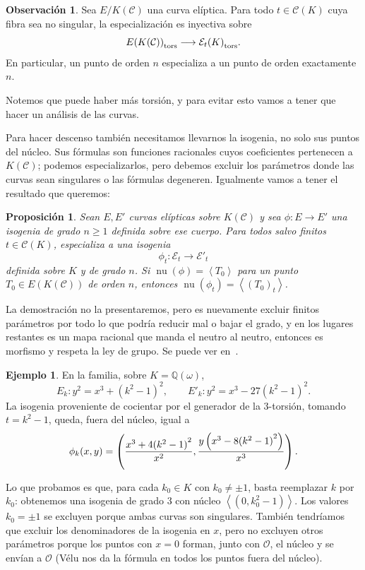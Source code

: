 \documentclass[a4paper]{book}
\theoremstyle{definition}
\newtheorem{example}[definition]{Ejemplo}
\newtheorem*{remark*}{Observación}
\theoremstyle{plain}
\newtheorem*{prop*}{Proposición}
\newcommand{\nbd}{\nobreakdash}
\DeclareMathOperator{\nuc}{nu}
\newcommand{\QQ}{\mathbb{Q}}
\newcommand{\OO}{\mathcal{O}}
\newcommand{\cc}{\mathcal{C}}
\newcommand{\ee}{\mathcal{E}}
\newcommand{\lp}{\left\lparen}
\newcommand{\rp}{\right\rparen}
\newcommand{\lc}{\left<}
\newcommand{\rc}{\right>}
\begin{document}
\begin{remark*}
Sea $E/K(\cc)$ una curva elíptica. Para todo $t\in\cc(K)$ cuya fibra sea no singular, la especialización es inyectiva sobre
\[
{E(K(\cc))}_{\rm tors}\longrightarrow{\ee_t(K)}_{\rm tors}.
\]
En particular, un punto de orden $n$ especializa a un punto de orden exactamente $n$.
\end{remark*}

Notemos que puede haber más torsión, y para evitar esto vamos a tener que hacer un análisis de las curvas.

Para hacer descenso también necesitamos llevarnos la isogenia, no solo sus puntos del núcleo. Sus fórmulas son funciones racionales cuyos coeficientes pertenecen a $K(\cc)$; podemos especializarlos, pero debemos excluir los parámetros donde las curvas sean singulares o las fórmulas degeneren. Igualmente vamos a tener el resultado que queremos:

\begin{prop*}
Sean $E,E'$ curvas elípticas sobre $K(\cc)$ y sea $\phi:E\to E'$ una isogenia de grado $n\geq1$ definida sobre ese cuerpo. Para todos salvo finitos $t\in\cc(K)$, especializa a una isogenia
\[
\phi_t:\ee_t\longrightarrow\ee'_t
\]
definida sobre $K$ y de grado $n$. Si $\nuc(\phi)=\lc T_0\rc$ para un punto $T_0\in E(K(\cc))$ de orden $n$, entonces $\nuc(\phi_t)=\lc {(T_0)}_t\rc$.
\end{prop*}

La demostración no la presentaremos, pero es nuevamente excluir finitos parámetros por todo lo que podría reducir mal o bajar el grado, y en los lugares restantes es un mapa racional que manda el neutro al neutro, entonces es morfismo y respeta la ley de grupo. Se puede ver en~\cite{SilvermanAdvanced}. 

\begin{example}
En la familia, sobre $K=\QQ(\omega)$,
\[
E_k:y^2=x^3+{(k^2-1)}^2,\qquad
E'_k:y^2=x^3-27{(k^2-1)}^2.
\]
La isogenia proveniente de cocientar por el generador de la $3$\nbd-torsión, tomando $t=k^2-1$, queda, fuera del núcleo, igual a
\[
\phi_k(x,y)=\lp
\frac{x^3+4{(k^2-1)}^2}{x^2},
\frac{y\lp x^3-8{(k^2-1)}^2\rp}{x^3}
\rp.
\]

Lo que probamos es que, para cada $k_0\in K$ con $k_0\neq\pm 1$, basta reemplazar $k$ por $k_0$: obtenemos una isogenia de grado $3$ con núcleo $\lc(0,k_0^2-1)\rc$. Los valores $k_0=\pm1$ se excluyen porque ambas curvas son singulares. También tendríamos que excluir los denominadores de la isogenia en $x$, pero no excluyen otros parámetros porque los puntos con $x=0$ forman, junto con $\OO$, el núcleo y se envían a $\OO$ (Vélu nos da la fórmula en todos los puntos fuera del núcleo).
\end{example}
\end{document}
